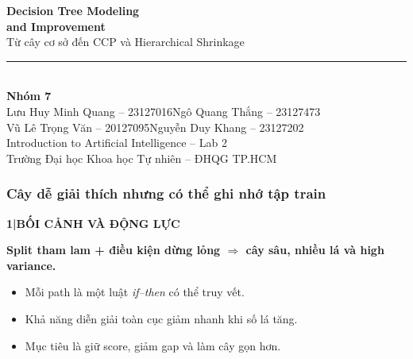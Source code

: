 \documentclass[aspectratio=169,12pt]{beamer}
\newcommand{\chaptertag}[2]{%
  \vspace{-0.16cm}%
  {\scriptsize\bfseries\textcolor{boxframe}{#1\enspace |\enspace #2}}\par
  \vspace{0.12cm}%
}
\newcommand{\groupname}{Nhóm 7}
\newcommand{\memberone}{Lưu Huy Minh Quang -- 23127016}
\newcommand{\membertwo}{Ngô Quang Thắng -- 23127473}
\newcommand{\memberthree}{Vũ Lê Trọng Văn -- 20127095}
\newcommand{\memberfour}{Nguyễn Duy Khang -- 23127202}
\begin{document}
\begin{frame}[plain]
  \begin{center}
    \vspace{0.35cm}
    {\LARGE\bfseries\textcolor{primaryblue}{Decision Tree Modeling}}\\[0.08cm]
    {\LARGE\bfseries\textcolor{primaryblue}{and Improvement}}\\[0.35cm]
    {\large Từ cây cơ sở đến CCP và Hierarchical Shrinkage}\\[0.55cm]
    {\color{primaryblue}\rule{0.74\textwidth}{1.2pt}}\\[0.52cm]
    {\normalsize\textbf{\groupname}}\\[0.18cm]
    {\small \memberone \quad \membertwo}\\[0.08cm]
    {\small \memberthree \quad \memberfour}\\[0.48cm]
    {\small Introduction to Artificial Intelligence -- Lab 2}\\[0.08cm]
    {\scriptsize Trường Đại học Khoa học Tự nhiên -- ĐHQG TP.HCM}
  \end{center}
\end{frame}

\begin{frame}
  \frametitle{Cây dễ giải thích nhưng có thể ghi nhớ tập train}
  \chaptertag{1}{BỐI CẢNH VÀ ĐỘNG LỰC}
  \begin{tcolorbox}[riskbox,width=0.90\textwidth,top=3mm,bottom=3mm]
    \centering\Large\bfseries
    Split tham lam + điều kiện dừng lỏng $\Rightarrow$ cây sâu, nhiều lá và high variance.
  \end{tcolorbox}
  \vspace{0.40cm}
  \begin{itemize}
    \item Mỗi path là một luật \textit{if--then} có thể truy vết.
    \item Khả năng diễn giải toàn cục giảm nhanh khi số lá tăng.
    \item Mục tiêu là giữ score, giảm gap và làm cây gọn hơn.
  \end{itemize}
\end{frame}
\end{document}
